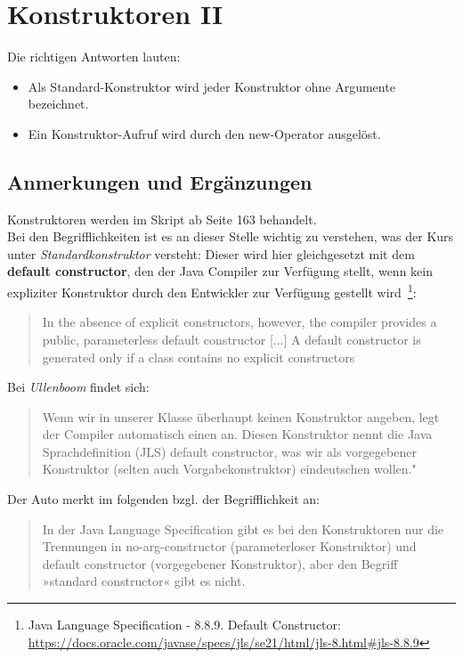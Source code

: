 \chapter{Konstruktoren II}

Die richtigen Antworten lauten:

\begin{itemize}
    \item Als Standard-Konstruktor wird jeder Konstruktor ohne Argumente bezeichnet.
    \item Ein Konstruktor-Aufruf wird durch den new-Operator ausgelöst.
\end{itemize}


\section*{Anmerkungen und Ergänzungen}

Konstruktoren werden im Skript ab Seite 163 behandelt.\\

Bei den Begrifflichkeiten ist es an dieser Stelle wichtig zu verstehen, was der Kurs unter \textit{Standardkonstruktor}
versteht: Dieser wird hier gleichgesetzt mit dem \textbf{default constructor}, den der Java Compiler zur Verfügung stellt,
wenn kein expliziter Konstruktor durch den Entwickler zur Verfügung gestellt wird~\footnote{
    Java Language Specification - 8.8.9. Default Constructor: \url{https://docs.oracle.com/javase/specs/jls/se21/html/jls-8.html#jls-8.8.9}
}:

\blockquote[{\cite[19 f.]{Blo17}}]{
    In the absence of explicit constructors, however, the compiler provides a public, parameterless default constructor [...]
    A default constructor is generated only if a class contains no explicit constructors
}

Bei \textit{Ullenboom} findet sich:

\blockquote[{\cite[515]{Ull12}}]{
    Wenn wir in unserer Klasse überhaupt keinen Konstruktor angeben, legt der Compiler automatisch einen an. Diesen
    Konstruktor nennt die Java Sprachdefinition (JLS) default constructor, was wir als vorgegebener Konstruktor
    (selten auch Vorgabekonstruktor) eindeutschen wollen."
}

Der Auto merkt im folgenden bzgl. der Begrifflichkeit an:

\blockquote[{\cite[516]{Ull12}}]{
    In der Java Language Specification gibt es bei den Konstruktoren nur die Trennungen in no-arg-constructor
    (parameterloser Konstruktor) und default constructor (vorgegebener Konstruktor), aber den Begriff
    »standard constructor« gibt es nicht.
}


